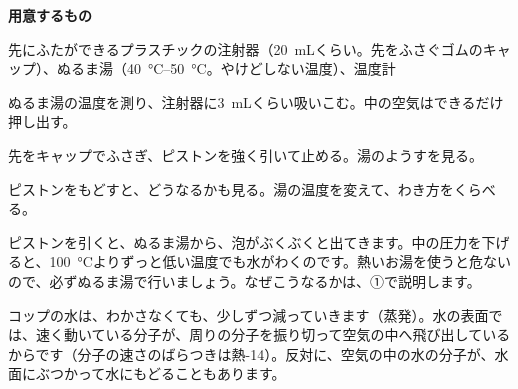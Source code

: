\begin{yattemiyou}
\textbf{用意するもの}\par
先にふたができるプラスチックの注射器（\qty{20}{mL}くらい。先をふさぐゴムのキャップ）、ぬるま湯（\qtyrange{40}{50}{\celsius}。やけどしない温度）、温度計
\begin{enumerate}[label={\bkcircled[bkGreen]{\arabic*}}, leftmargin=2.4\zw, itemsep=1pt, topsep=2pt]
\item ぬるま湯の温度を測り、注射器に\qty{3}{mL}くらい吸いこむ。中の空気はできるだけ押し出す。
\item 先をキャップでふさぎ、ピストンを強く引いて止める。湯のようすを見る。
\item ピストンをもどすと、どうなるかも見る。湯の温度を変えて、わき方をくらべる。
\end{enumerate}
\end{yattemiyou}

\noindent ピストンを引くと、ぬるま湯から、泡がぶくぶくと出てきます。中の圧力を下げると、\qty{100}{\celsius}よりずっと低い温度でも水がわくのです。熱いお湯を使うと危ないので、必ずぬるま湯で行いましょう。なぜこうなるかは、①で説明します。

\begin{omoidasou}
\end{omoidasou}



\leavevmode\label{ph:熱-8:sec1}コップの水は、わかさなくても、少しずつ減っていきます（蒸発）。水の表面では、速く動いている分子が、周りの分子を振り切って空気の中へ飛び出しているからです（分子の速さのばらつきは熱-14）。反対に、空気の中の水の分子が、水面にぶつかって水にもどることもあります。

